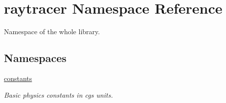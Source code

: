 \hypertarget{namespaceraytracer}{}\section{raytracer Namespace Reference}
\label{namespaceraytracer}


Namespace of the whole library.  


\subsection*{Namespaces}
\begin{DoxyCompactItemize}
\item 
 \hyperlink{namespaceraytracer_1_1constants}{constants}
\begin{DoxyCompactList}\small\item\em Basic physics constants in cgs units. \end{DoxyCompactList}\end{DoxyCompactItemize}
